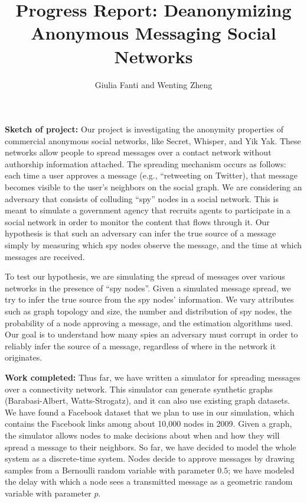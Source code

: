 \documentclass[11pt, onecolumn]{article}
\begin{document}
\title{Progress Report: Deanonymizing Anonymous Messaging Social Networks}

\author{Giulia Fanti and Wenting Zheng}

   \date{}
   \maketitle
   \thispagestyle{empty}
\textbf{Sketch of project:} Our project is investigating the anonymity properties of commercial anonymous social networks, like Secret, Whisper, and Yik Yak. These networks allow people to spread messages over a contact network without authorship information attached. The spreading mechanism occurs as follows: each time a user approves a message (e.g., “retweeting  on Twitter), that message becomes visible to the user’s neighbors on the social graph. We are considering an adversary that consists of colluding “spy” nodes in a social network. This is meant to simulate a government agency that recruits agents to participate in a social network in order to monitor the content that flows through it. Our hypothesis is that such an adversary can infer the true source of a message simply by measuring which spy nodes observe the message, and the time at which messages are received. 

To test our hypothesis, we are simulating the spread of messages over various networks in the presence of “spy nodes”. Given a simulated message spread, we try to infer the true source from the spy nodes’ information.  We vary attributes such as graph topology and size, the number and distribution of spy nodes, the probability of a node approving a message, and the estimation algorithms used. Our goal is to understand how many spies an adversary must corrupt in order to reliably infer the source of a message, regardless of where in the network it originates.

\vspace{0.1in}
\textbf{Work completed:} Thus far, we have written a simulator for spreading messages over a connectivity network. This simulator can generate synthetic graphs (Barabasi-Albert, Watts-Strogatz), and it can also use existing graph datasets. We have found a Facebook dataset that we plan to use in our simulation, which contains the Facebook links among about 10,000 nodes in 2009. Given a graph, the simulator allows nodes to make decisions about when and how they will spread a message to their neighbors. So far, we have decided to model the whole system as a discrete-time system. Nodes decide to approve messages by drawing samples from a Bernoulli random variable with parameter $0.5$; we have modeled the delay with which a node sees a transmitted message as a geometric random variable with parameter $p$. 
\end{document}
